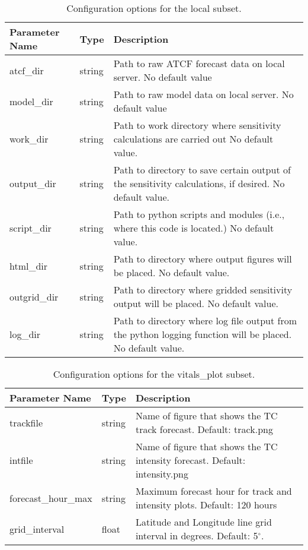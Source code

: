 \documentclass[psfig,12pt]{article}
\begin{document}
\begin{table}[H]
\caption{Configuration options for the local subset.}
\begin{center}
\begin{tabular}{|p{1.25in}|p{0.5in}|p{4.5in}|}
\hline
Parameter Name & Type & Description \\ \hline\hline
atcf\_dir & string & Path to raw ATCF forecast data on local server.  No default value \\ \hline
model\_dir & string & Path to raw model data on local server.  No default value \\ \hline
work\_dir & string & Path to work directory where sensitivity calculations are carried out
No default value. \\ \hline
output\_dir & string & Path to directory to save certain output of the sensitivity 
calculations, if desired.  No default value.  \\ \hline
script\_dir & string & Path to python scripts and modules (i.e., where this code is located.)
No default value. \\ \hline
html\_dir & string & Path to directory where output figures will be placed.
No default value.  \\ \hline
outgrid\_dir & string & Path to directory where gridded sensitivity output will be placed.
No default value.  \\ \hline
log\_dir & string & Path to directory where log file output from the python logging function
will be placed.  No default value. \\ \hline
\end{tabular}
\end{center}
\end{table}

\begin{table}[H]  
\caption{Configuration options for the vitals\_plot subset.}
\begin{center}
\begin{tabular}{|p{1.25in}|p{0.5in}|p{4.5in}|}
\hline
Parameter Name & Type & Description \\ \hline \hline
trackfile & string & Name of figure that shows the TC track forecast.  Default:  track.png \\ \hline
intfile & string & Name of figure that shows the TC intensity forecast.  Default:  intensity.png \\ \hline
forecast\_hour\_max & string & Maximum forecast hour for track and intensity plots.  
Default:  120 hours \\ \hline
grid\_interval & float & Latitude and Longitude line grid interval in degrees.  
Default:  5$^{\circ}$.  \\ \hline
\end{tabular}
\end{center}
\end{table}
\end{document}
